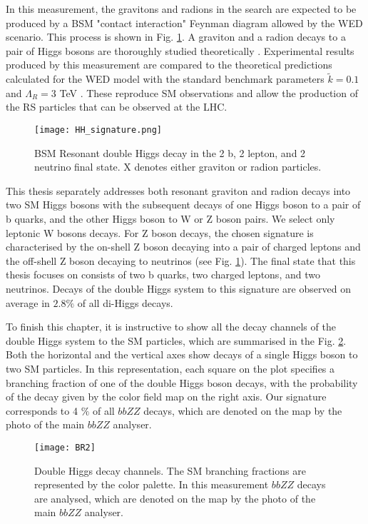 In this measurement, the gravitons and radions in the search are expected to be produced by a BSM "contact interaction" Feynman diagram allowed by the WED scenario. This process is shown in Fig. \ref{HH_signature}.  A graviton and a radion decays to a pair of Higgs bosons are thoroughly studied theoretically \cite{Chen:2014xra, HHXsec, Contino:2012xk}. Experimental results produced by this measurement are compared to the theoretical predictions calculated for the WED model with the standard benchmark parameters $\tilde{k}=0.1$ and $\Lambda_R = 3 $ TeV \cite{Wertz:2632195, Cadamuro:2292733}. These reproduce SM observations and allow the production of the RS particles that can be observed at the LHC. 





\begin{figure}[H]
  \centering
    \texttt{[image: HH\_signature.png]}
    \caption{BSM Resonant double Higgs decay in the 2 b, 2 lepton, and 2 neutrino final state. X denotes either graviton or radion particles. }
    \label{HH_signature}
\end{figure}




This thesis separately addresses both resonant graviton and radion decays into two SM Higgs bosons with the subsequent decays of one Higgs boson to a pair of b quarks, and the other Higgs boson to W or Z boson pairs. We select only leptonic W bosons decays. For Z boson decays, the chosen signature is characterised by the on-shell Z boson decaying into a pair of charged leptons and the off-shell Z boson decaying to neutrinos (see Fig. \ref{HH_signature}). The final state that this thesis focuses on consists of two b quarks, two charged leptons, and two neutrinos. Decays of the double Higgs system to this signature are observed on average in $2.8 \%$ of all di-Higgs decays. 


To finish this chapter, it is instructive to show all the decay channels of the double Higgs system to the SM particles, which are summarised in the Fig. \ref{BR}. Both the horizontal and the vertical axes show decays of a single Higgs boson to two SM particles. In this representation, each square on the plot specifies a branching fraction of one of the double Higgs boson decays, with the probability of the decay given by the color field map on the right axis. Our signature corresponds to 4 $\%$ of all $bbZZ$ decays, which are denoted on the map by the photo of the main $bbZZ$ analyser. 

\begin{figure}[H]
  \centering
    \texttt{[image: BR2]}
    \caption[Double Higgs decay channels]{Double Higgs decay channels. The SM branching fractions are represented by the color palette. In this measurement $bbZZ$ decays are analysed, which are denoted on the map by the photo of the main $bbZZ$ analyser.}
    \label{BR}
\end{figure}



